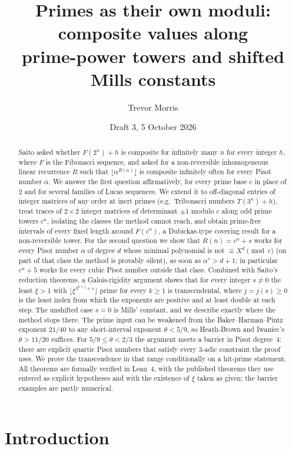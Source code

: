 \documentclass[11pt]{amsart}
\title[Primes as their own moduli]{Primes as their own moduli: composite values along\\ prime-power towers and shifted Mills constants}
\author{Trevor Morris}
\date{Draft 3, 5 October 2026}
\theoremstyle{definition}
\newcommand{\floor}[1]{\lfloor #1 \rfloor}
\begin{document}
\begin{abstract}
Saito asked whether $F(2^n)+h$ is composite for infinitely many $n$ for every integer $h$, where $F$ is the Fibonacci sequence, and asked for a non-reversible inhomogeneous linear recurrence $R$ such that $\floor{\alpha^{R(n)}}$ is composite infinitely often for every Pisot number $\alpha$.  We answer the first question affirmatively, for every prime base $c$ in place of $2$ and for several families of Lucas sequences.  We extend it to off-diagonal entries of integer matrices of any order at inert primes (e.g.\ Tribonacci numbers $T(3^n)+h$), treat traces of $2\times 2$ integer matrices of determinant $\pm1$ modulo $c$ along odd prime towers $c^n$, isolating the classes the method cannot reach, and obtain prime-free intervals of every fixed length around $F(c^n)$, a Dubickas-type covering result for a non-reversible tower.  For the second question we show that $R(n)=c^n+s$ works for every Pisot number $\alpha$ of degree $d$ whose minimal polynomial is not $\equiv X^d \pmod c$ (on part of that class the method is provably silent), as soon as $\alpha^s> d+1$; in particular $c^n+5$ works for every cubic Pisot number outside that class.  Combined with Saito's reduction theorems, a Galois-rigidity argument shows that for every integer $s\neq0$ the least $\xi>1$ with $\floor{\xi^{3^{k+j}+s}}$ prime for every $k\ge1$ is transcendental, where $j=j(s)\ge0$ is the least index from which the exponents are positive and at least double at each step.  The unshifted case $s=0$ is Mills' constant, and we describe exactly where the method stops there.  The prime input can be weakened from the Baker--Harman--Pintz exponent $21/40$ to any short-interval exponent $\theta<5/9$, so Heath-Brown and Iwaniec's $\theta>11/20$ suffices.  For $5/9\le\theta<2/3$ the argument meets a barrier in Pisot degree~$4$: there are explicit quartic Pisot numbers that satisfy every $3$-adic constraint the proof uses.  We prove the transcendence in that range conditionally on a hit-prime statement.  All theorems are formally verified in Lean~4, with the published theorems they use entered as explicit hypotheses and with the existence of $\xi$ taken as given; the barrier examples are partly numerical.
\end{abstract}

\maketitle

\section{Introduction}
\end{document}
